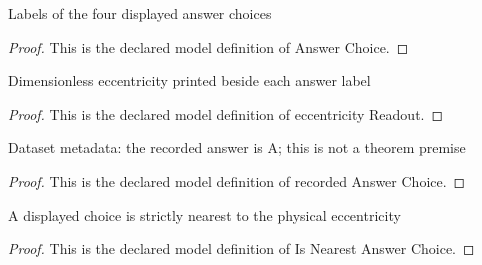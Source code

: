 \begin{definition}
  \label{def:physics:phyx-mini-0104:phyxminiproblems-problemphyxmini0104-answerchoice}
  Labels of the four displayed answer choices
\end{definition}
\begin{proof}
  This is the declared model definition of Answer Choice.
\end{proof}
\begin{definition}
  \label{def:physics:phyx-mini-0104:phyxminiproblems-problemphyxmini0104-answerchoice-eccentricityreadout}
  Dimensionless eccentricity printed beside each answer label
\end{definition}
\begin{proof}
  This is the declared model definition of eccentricity Readout.
\end{proof}
\begin{definition}
  \label{def:physics:phyx-mini-0104:phyxminiproblems-problemphyxmini0104-recordedanswerchoice}
  Dataset metadata: the recorded answer is A; this is not a theorem premise
\end{definition}
\begin{proof}
  This is the declared model definition of recorded Answer Choice.
\end{proof}
\begin{definition}
  \label{def:physics:phyx-mini-0104:phyxminiproblems-problemphyxmini0104-isnearestanswerchoice}
  A displayed choice is strictly nearest to the physical eccentricity
\end{definition}
\begin{proof}
  This is the declared model definition of Is Nearest Answer Choice.
\end{proof}
